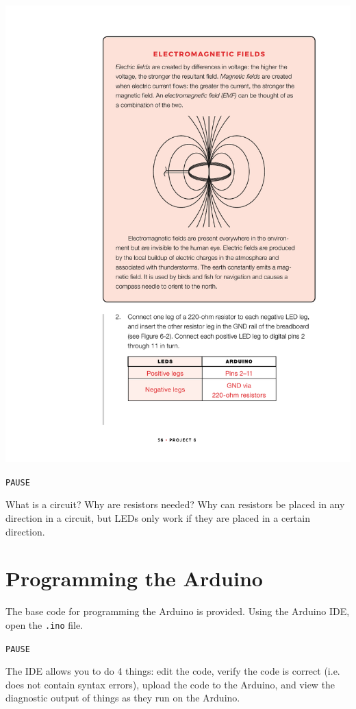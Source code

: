 \documentclass[11pt]{article}
\begin{document}
\begin{center}
\includegraphics[width=.9\linewidth]{./exp3-ghost-detector4.pdf}
\end{center}

\texttt{PAUSE}

What is a circuit? Why are resistors needed? Why can resistors be placed in any direction in a circuit, but LEDs
only work if they are placed in a certain direction.

\section{Programming the Arduino}
\label{sec:org0f13fc0}

The base code for programming the Arduino is provided. Using the Arduino IDE, open the \texttt{.ino} file.

\texttt{PAUSE}

The IDE allows you to do 4 things: edit the code, verify the code is correct (i.e. does not contain syntax
errors), upload the code to the Arduino, and view the diagnostic output of things as they run on the Arduino.
\end{document}

